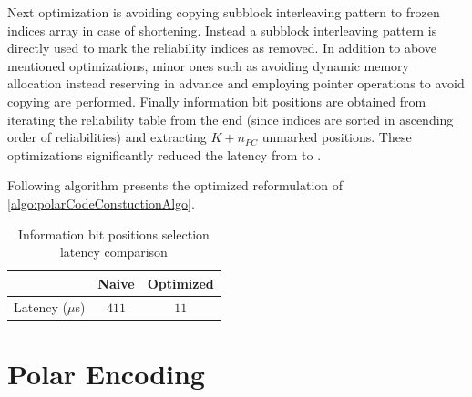 
Next optimization is avoiding copying subblock interleaving pattern to frozen indices array in case of shortening. Instead a subblock interleaving pattern is directly used to mark the reliability indices as removed. In addition to above mentioned optimizations, minor ones such as avoiding dynamic memory allocation instead reserving in advance and employing pointer operations to avoid copying are performed. Finally information bit positions are obtained from iterating the reliability table from the end (since indices are sorted in ascending order of reliabilities) and extracting $K+n_{PC}$ unmarked positions. These optimizations significantly reduced the latency from  to .

Following algorithm presents the optimized reformulation of \ref{algo:polarCodeConstuctionAlgo}.


\begin{table}[h!]
	\begin{center}
		\caption{Information bit positions selection latency comparison}
		\label{tab:codeConstrLatency}
		\begin{tabular}{c|c|c} %
			\textbf{ } & Naive & Optimized \\
			\hline
			Latency ($\mu$s) & $411$ & $11$\\
		\end{tabular}
	\end{center}
\end{table}


\section{Polar Encoding}

